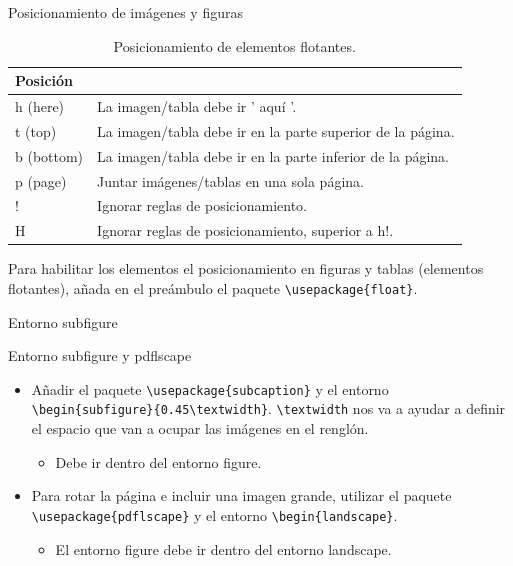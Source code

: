 \documentclass[aspectratio=169, 10pt]{beamer}
\begin{document}
\begin{frame}[fragile]{Posicionamiento de imágenes y figuras}
\begin{table}[H]
\begin{tabular}{|l|l|}
\hline
Posición   &                                                            \\ \hline
h (here)   & La imagen/tabla debe ir  ' aquí '.                            \\ \hline
t (top)    & La imagen/tabla debe ir en la parte superior de la página. \\ \hline
b (bottom) & La imagen/tabla debe ir en la parte inferior de la página. \\ \hline
p (page)   & Juntar imágenes/tablas en una sola página.                    \\ \hline
!          & Ignorar reglas de posicionamiento.                         \\ \hline
H          & Ignorar reglas de posicionamiento, superior a h!.          \\ \hline
\end{tabular}
\caption{Posicionamiento de elementos flotantes.}
\end{table}

Para habilitar los elementos el posicionamiento en figuras y tablas (elementos flotantes), añada en el preámbulo el paquete \verb|\usepackage{float}|.

\end{frame}

\begin{frame}[fragile]{Entorno subfigure}
\centering

    \begin{block}{Entorno subfigure y pdflscape}
        \begin{itemize}
            \item \small{Añadir el paquete \verb|\usepackage{subcaption}| y el entorno \verb|\begin{subfigure}{0.45\textwidth}|}. \verb|\textwidth| nos va a ayudar a definir el espacio que van a ocupar las imágenes en el renglón.
            \begin{itemize} \pause
                \item Debe ir dentro del entorno figure.
            \end{itemize} \pause
            \item \small{Para rotar la página e incluir una imagen grande, utilizar el paquete \verb|\usepackage{pdflscape}| y el entorno \verb|\begin{landscape}|}.
            \begin{itemize}
                \item El entorno figure debe ir dentro del entorno landscape.
            \end{itemize}
                
        \end{itemize}
    \end{block}


\end{frame}
\end{document}
